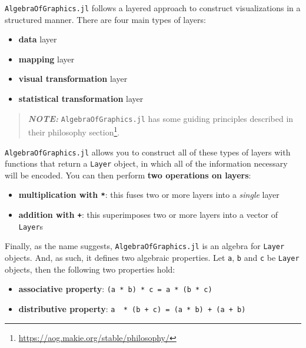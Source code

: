 \documentclass[
  notoc %
]{tufte-book}
\DeclareRobustCommand{\href}[2]{#2\footnote{\url{#1}}}
\providecommand{\tightlist}{%
  \setlength{\itemsep}{0pt}\setlength{\parskip}{0pt}
}
\newcommand{\passthrough}[1]{#1}
\begin{document}
\passthrough{\lstinline!AlgebraOfGraphics.jl!} follows a layered
approach to construct visualizations in a structured manner. There are
four main types of layers:

\begin{itemize}
\tightlist
\item
  \textbf{data} layer
\item
  \textbf{mapping} layer
\item
  \textbf{visual transformation} layer
\item
  \textbf{statistical transformation} layer
\end{itemize}

\begin{quote}
\textbf{\emph{NOTE:}} \passthrough{\lstinline!AlgebraOfGraphics.jl!} has
some guiding principles described in their
\href{https://aog.makie.org/stable/philosophy/}{philosophy section}.
\end{quote}

\passthrough{\lstinline!AlgebraOfGraphics.jl!} allows you to construct
all of these types of layers with functions that return a
\passthrough{\lstinline!Layer!} object, in which all of the information
necessary will be encoded. You can then perform \textbf{two operations
on layers}:

\begin{itemize}
\tightlist
\item
  \textbf{multiplication with \passthrough{\lstinline!*!}}: this fuses
  two or more layers into a \emph{single} layer
\item
  \textbf{addition with \passthrough{\lstinline!+!}}: this superimposes
  two or more layers into a vector of \passthrough{\lstinline!Layer!}s
\end{itemize}

Finally, as the name suggests,
\passthrough{\lstinline!AlgebraOfGraphics.jl!} is an algebra for
\passthrough{\lstinline!Layer!} objects. And, as such, it defines two
algebraic properties. Let \passthrough{\lstinline!a!},
\passthrough{\lstinline!b!} and \passthrough{\lstinline!c!} be
\passthrough{\lstinline!Layer!} objects, then the following two
properties hold:

\begin{itemize}
\tightlist
\item
  \textbf{associative property}:
  \passthrough{\lstinline!(a * b) * c = a * (b * c)!}
\item
  \textbf{distributive property}:
  \passthrough{\lstinline!a  * (b + c) = (a * b) + (a + b)!}
\end{itemize}
\end{document}
